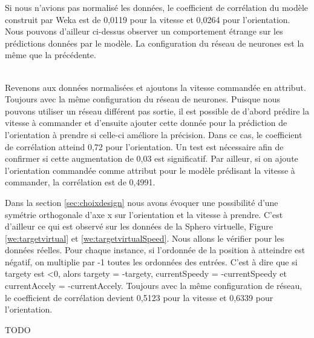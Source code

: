 Si nous n'avions pas normalisé les données, le coefficient de corrélation du modèle construit par Weka est de 0,0119 pour la vitesse et 0,0264 pour l'orientation.
Nous pouvons d'ailleur ci-dessus observer un comportement étrange sur les prédictions données par le modèle.
La configuration du réseau de neurones est la même que la précédente.

\\

Revenons aux données normalisées et ajoutons la vitesse commandée en attribut.
Toujours avec la même configuration du réseau de neurones.
Puisque nous pouvons utiliser un réseau différent pas sortie, il est possible de d'abord prédire la vitesse à commander et d'ensuite ajouter cette donnée pour la prédiction de l'orientation à prendre si celle-ci améliore la précision.
Dans ce cas, le coefficient de corrélation atteind 0,72 pour l'orientation.
Un test est nécessaire afin de confirmer si cette augmentation de 0,03 est significatif.
Par ailleur, si on ajoute l'orientation commandée comme attribut pour le modèle prédisant la vitesse à commander, la corrélation est de 0,4991.

Dans la section \ref{sec:choixdesign} nous avons évoquer une possibilité d'une symétrie orthogonale d'axe x sur l'orientation et la vitesse à prendre.
C'est d'ailleur ce qui est observé sur les données de la Sphero virtuelle, Figure \ref{we:targetvirtual} et \ref{we:targetvirtualSpeed}.
Nous allons le vérifier pour les données réelles.
Pour chaque instance, si l'ordonnée de la position à atteindre est négatif, on multiplie par -1 toutes les ordonnées des entrées.
C'est à dire que si targety est <0, alors targety = -targety, currentSpeedy = -currentSpeedy et currentAccely = -currentAccely.
Toujours avec la même configuration de réseau, le coefficient de corrélation devient 0,5123 pour la vitesse et 0,6339 pour l'orientation.

TODO